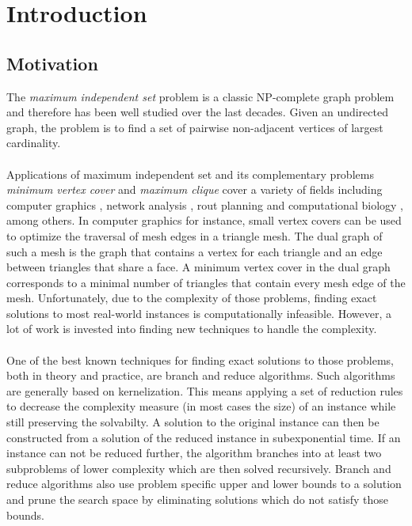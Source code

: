 \documentclass[]{article}
\title{}
\author{}
\begin{document}



\section{Introduction} \label{sec1}
\subsection{Motivation}
The \emph{maximum independent set} problem is a classic NP-complete graph problem \cite{GareyJohnson} and therefore has been well studied over the last decades. Given an undirected graph, the problem is to find a set of pairwise non-adjacent vertices of largest cardinality.\paragraph{}
Applications of maximum independent set and its complementary problems \emph{minimum vertex cover} and \emph{maximum clique} cover a variety of fields including computer graphics \cite{CG}, network analysis \cite{NW}, rout planning \cite{RP} and computational biology \cite{BIO1, BIO2}, among others. In computer graphics for instance, small vertex covers can be used to optimize the traversal of mesh edges in a triangle mesh. The dual graph of such a mesh is the graph that contains a vertex for each triangle and an edge between triangles that share a face. A minimum vertex cover in the dual graph corresponds to a minimal number of triangles that contain every mesh edge of the mesh. Unfortunately, due to the complexity of those problems, finding exact solutions to most real-world instances is computationally infeasible. However, a lot of work is invested into finding new techniques to handle the complexity. \paragraph{}
One of the best known techniques for finding exact solutions to those problems, both  in theory and practice, are branch and reduce algorithms. Such algorithms are generally based on kernelization. This means applying a set of reduction rules to decrease the complexity measure (in most cases the size) of an instance while still preserving the solvabilty. A solution to the original instance can then be constructed from a solution of the reduced instance in subexponential time. If an instance can not be reduced further, the algorithm branches into at least two subproblems of lower complexity which are then solved recursively. Branch and reduce algorithms also use problem specific upper and lower bounds to a solution and prune the search space by eliminating solutions which do not satisfy those bounds. \paragraph{}
\end{document}
